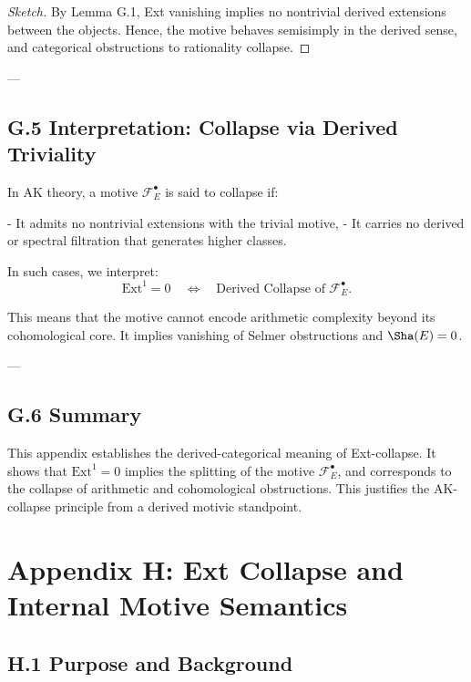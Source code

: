 \begin{proof}[Sketch]
By Lemma G.1, Ext vanishing implies no nontrivial derived extensions between the objects.  
Hence, the motive behaves semisimply in the derived sense,  
and categorical obstructions to rationality collapse.
\end{proof}

---

\subsection*{G.5 Interpretation: Collapse via Derived Triviality}

In AK theory, a motive \( \mathcal{F}_E^\bullet \) is said to collapse if:

- It admits no nontrivial extensions with the trivial motive,
- It carries no derived or spectral filtration that generates higher classes.

In such cases, we interpret:
\[
\mathrm{Ext}^1 = 0 \quad \Longleftrightarrow \quad \text{Derived Collapse of } \mathcal{F}_E^\bullet.
\]

This means that the motive cannot encode arithmetic complexity beyond its cohomological core.  
It implies vanishing of Selmer obstructions and \( \Sha(E) = 0 \).

---

\subsection*{G.6 Summary}

This appendix establishes the derived-categorical meaning of Ext-collapse.  
It shows that \( \mathrm{Ext}^1 = 0 \) implies the splitting of the motive \( \mathcal{F}_E^\bullet \),  
and corresponds to the collapse of arithmetic and cohomological obstructions.  
This justifies the AK-collapse principle from a derived motivic standpoint.



\section*{Appendix H: Ext Collapse and Internal Motive Semantics}

\subsection*{H.1 Purpose and Background}

